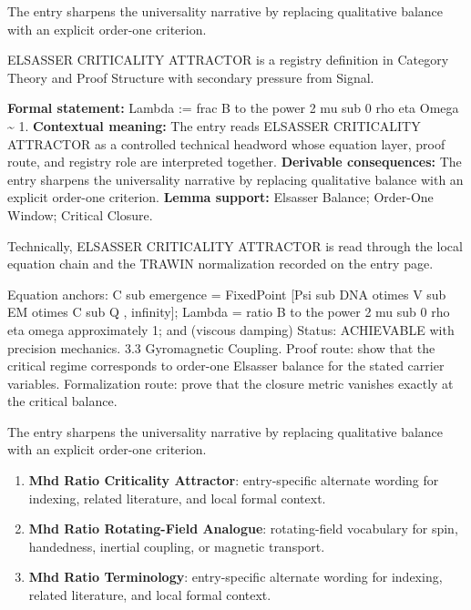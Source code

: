 The entry sharpens the universality narrative by replacing qualitative balance with an explicit order-one criterion.
\clearpage


\begingroup\small
{}
ELSASSER CRITICALITY ATTRACTOR is a registry definition in Category Theory and Proof Structure with secondary pressure from Signal.

\begingroup\footnotesize\setlength{\emergencystretch}{3em}\sloppy
\textbf{Formal statement:} Lambda := frac B to the power 2 mu sub 0 rho eta Omega \textasciitilde{} 1. \textbf{Contextual meaning:} The entry reads ELSASSER CRITICALITY ATTRACTOR as a controlled technical headword whose equation layer, proof route, and registry role are interpreted together. \textbf{Derivable consequences:} The entry sharpens the universality narrative by replacing qualitative balance with an explicit order-one criterion. \textbf{Lemma support:} Elsasser Balance; Order-One Window; Critical Closure.\par
\endgroup

Technically, ELSASSER CRITICALITY ATTRACTOR is read through the local equation chain and the TRAWIN normalization recorded on the entry page.

Equation anchors: C sub emergence = FixedPoint [Psi sub DNA otimes V sub EM otimes C sub Q , infinity]; Lambda = ratio B to the power 2 mu sub 0 rho eta omega approximately 1; and (viscous damping) Status: ACHIEVABLE with precision mechanics. 3.3 Gyromagnetic Coupling. Proof route: show that the critical regime corresponds to order-one Elsasser balance for the stated carrier variables. Formalization route: prove that the closure metric vanishes exactly at the critical balance.

The entry sharpens the universality narrative by replacing qualitative balance with an explicit order-one criterion.
\endgroup

\begin{enumerate}[leftmargin=1.6em,itemsep=6pt,topsep=4pt]
\item \textbf{Mhd Ratio Criticality Attractor}: entry-specific alternate wording for indexing, related literature, and local formal context.
\item \textbf{Mhd Ratio Rotating-Field Analogue}: rotating-field vocabulary for spin, handedness, inertial coupling, or magnetic transport.
\item \textbf{Mhd Ratio Terminology}: entry-specific alternate wording for indexing, related literature, and local formal context.
\end{enumerate}

